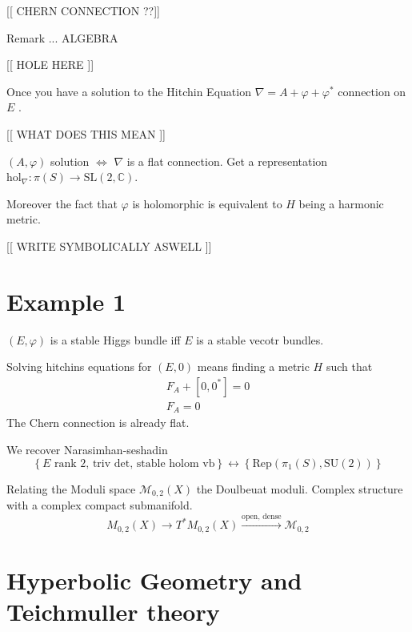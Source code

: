 [[ CHERN CONNECTION ??]] 


Remark ... 
ALGEBRA 

[[ HOLE HERE ]] 

Once you have a solution to the Hitchin Equation 
$\nabla = A +\varphi + \varphi^* $ connection on $E$ . 

[[ WHAT DOES THIS MEAN ]] 

$(A, \varphi)$ solution $\Leftrightarrow$ $\nabla $ is a flat connection. 
Get a representation $ \mathrm{hol}_\nabla : \pi(S) \rightarrow \mathrm{SL}(2, \mathbb{C} ) $. 

Moreover the fact that $ \varphi$ is holomorphic is equivalent to $H$ being a harmonic metric. 

[[ WRITE SYMBOLICALLY ASWELL ]] 



\section{Example 1} %

$(E, \varphi)$ is a stable Higgs bundle iff $E$ is a stable vecotr bundles. 

Solving hitchins equations for $ (E, 0 ) $ means finding a metric $H$ such that 
\begin{align}
    F_A + [0,0^*] = 0 \\
    F_A = 0 
\end{align}
The Chern connection is already flat. 

We recover Narasimhan-seshadin
\begin{equation}
    \left\{ E \mbox{ rank 2, triv det, stable holom vb} \right\} \leftrightarrow 
    \left\{ \mathrm{Rep}( \pi_1 ( S) , \mathrm{SU}(2) ) \right\} 
\end{equation}

Relating the Moduli space $ \mathcal{M} _{0,2} (X)$ the Doulbeuat moduli. 
Complex structure with a complex compact submanifold. 
\begin{equation}
    M_{0,2} (X) \rightarrow T^* M_{0,2} (X) \xrightarrow{ \mbox{open, dense} } \mathcal{M} _{0,2}
\end{equation}



\section{Hyperbolic Geometry and Teichmuller theory} %

